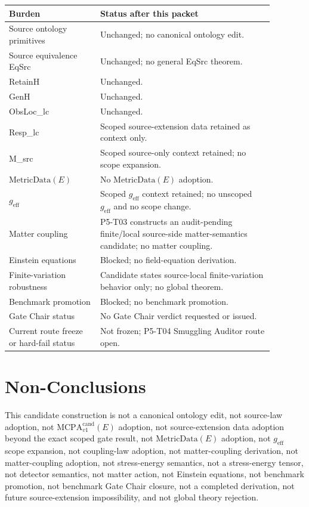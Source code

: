 \documentclass[11pt]{article}
\newcommand{\MetricData}{\mathrm{MetricData}}
\newcommand{\geff}{g_{\mathrm{eff}}}
\newcommand{\MCPA}{\mathrm{MCPA}^{\mathrm{cand}}_{v1}}
\begin{document}
\begin{longtable}{p{0.30\linewidth}p{0.58\linewidth}}
\toprule
Burden & Status after this packet \\
\midrule
Source ontology primitives & Unchanged; no canonical ontology edit. \\
Source equivalence EqSrc & Unchanged; no general EqSrc theorem. \\
RetainH & Unchanged. \\
GenH & Unchanged. \\
ObsLoc_lc & Unchanged. \\
Resp_lc & Scoped source-extension data retained as context only. \\
M_src & Scoped source-only context retained; no scope expansion. \\
\(\MetricData(E)\) & No \(\MetricData(E)\) adoption. \\
\(\geff\) & Scoped \(\geff\) context retained; no unscoped \(\geff\) and no scope change. \\
Matter coupling & P5-T03 constructs an audit-pending finite/local source-side matter-semantics candidate; no matter coupling. \\
Einstein equations & Blocked; no field-equation derivation. \\
Finite-variation robustness & Candidate states source-local finite-variation behavior only; no global theorem. \\
Benchmark promotion & Blocked; no benchmark promotion. \\
Gate Chair status & No Gate Chair verdict requested or issued. \\
Current route freeze or hard-fail status & Not frozen; P5-T04 Smuggling Auditor route open. \\
\bottomrule
\end{longtable}

\section{Non-Conclusions}

This candidate construction is not a canonical ontology edit, not source-law
adoption, not \(\MCPA(E)\) adoption, not source-extension data adoption beyond
the exact scoped gate result, not \(\MetricData(E)\) adoption, not \(\geff\)
scope expansion, not coupling-law adoption, not matter-coupling derivation,
not matter-coupling adoption, not stress-energy semantics, not a
stress-energy tensor, not detector semantics, not matter action, not Einstein
equations, not benchmark promotion, not benchmark Gate Chair closure, not a
completed derivation, not future source-extension impossibility, and not
global theory rejection.
\end{document}
